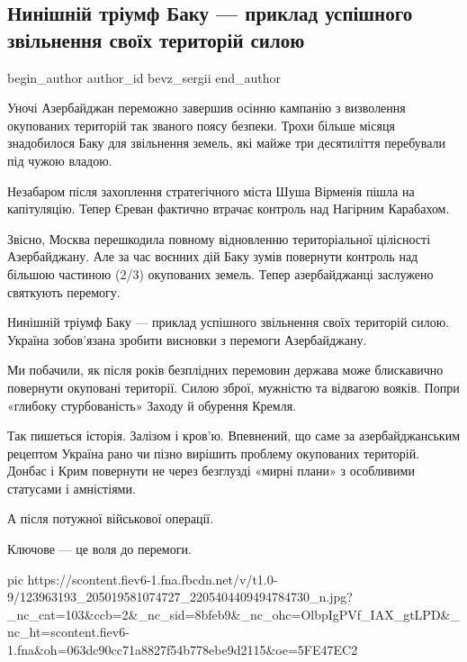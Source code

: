  
 
 
 
 
 
\subsection{Нинішній тріумф Баку --- приклад успішного звільнення своїх територій силою}
\label{sec:10_11_2020.fb.bevz_sergii.1.triumf_baku}
\ifcmt
	begin_author
   author_id bevz_sergii
	end_author
\fi

Уночі Азербайджан переможно завершив осінню кампанію з визволення окупованих
територій так званого поясу безпеки. Трохи більше місяця знадобилося Баку для
звільнення земель, які майже три десятиліття перебували під чужою владою.

Незабаром після захоплення стратегічного міста Шуша Вірменія пішла на
капітуляцію. Тепер Єреван фактично втрачає контроль над Нагірним Карабахом.

Звісно, Москва перешкодила повному відновленню територіальної цілісності
Азербайджану. Але за час воєнних дій Баку зумів повернути контроль над більшою
частиною (2/3) окупованих земель. Тепер азербайджанці заслужено святкують
перемогу.

Нинішній тріумф Баку --- приклад успішного звільнення своїх територій силою.
Україна зобов’язана зробити висновки з перемоги Азербайджану. 

Ми побачили, як після років безплідних перемовин держава може блискавично
повернути окуповані території. Силою зброї, мужністю та відвагою вояків. Попри
«глибоку стурбованість» Заходу й обурення Кремля. 

Так пишеться історія. Залізом і кров’ю. Впевнений, що саме за азербайджанським
рецептом Україна рано чи пізно вирішить проблему окупованих територій. Донбас і
Крим повернути не через безглузді «мирні плани» з особливими статусами і
амністіями. 

А після потужної військової операції.

Ключове --- це воля до перемоги.

\ifcmt
pic https://scontent.fiev6-1.fna.fbcdn.net/v/t1.0-9/123963193_205019581074727_2205404409494784730_n.jpg?_nc_cat=103&ccb=2&_nc_sid=8bfeb9&_nc_ohc=OlbpIgPVf_IAX_gtLPD&_nc_ht=scontent.fiev6-1.fna&oh=063dc90cc71a8827f54b778ebe9d2115&oe=5FE47EC2
\fi
